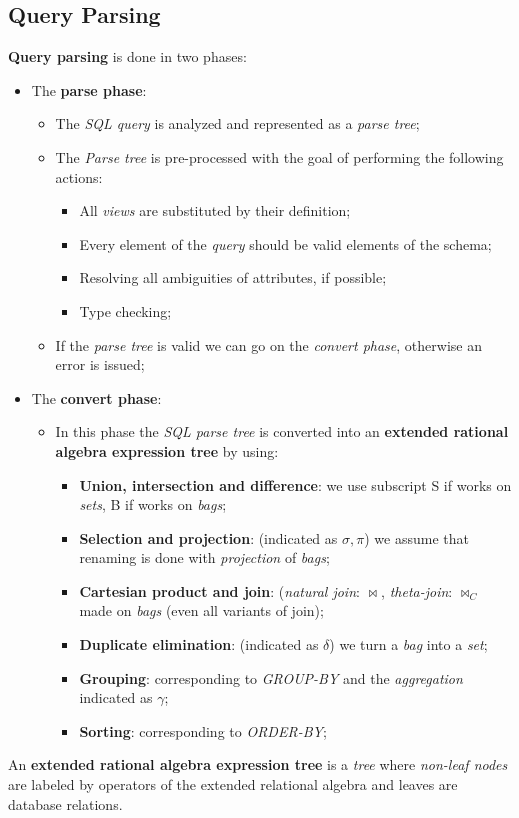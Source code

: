 \documentclass{article}
\begin{document}
\subsection{Query Parsing}
\textbf{Query parsing} is done in two phases: 
\begin{itemize}
\item The \textbf{parse phase}:
\begin{itemize}
\item The \emph{SQL query} is analyzed and represented as a \emph{parse tree};
\item The \emph{Parse tree} is pre-processed with the goal of performing the following actions:
\begin{itemize}
\item All \emph{views} are substituted by their definition;
\item Every element of the \emph{query} should be valid elements of the schema;
\item Resolving all ambiguities of attributes, if possible;
\item Type checking;
\end{itemize}
\item If the \emph{parse tree} is valid we can go on the \emph{convert phase}, otherwise an error is issued;
\end{itemize}
\item The \textbf{convert phase}:
\begin{itemize}
\item In this phase the \emph{SQL parse tree} is converted into an \textbf{extended rational algebra expression tree} by using:
\begin{itemize}
\item \textbf{Union, intersection and difference}: we use subscript S if works on \emph{sets}, B if works on \emph{bags};
\item \textbf{Selection and projection}: (indicated as $\sigma, \pi$) we assume that renaming is done with \emph{projection} of \emph{bags};
\item \textbf{Cartesian product and join}: (\emph{natural join}: $\bowtie $, \emph{theta-join}: $\bowtie_C$ made on \emph{bags} (even all variants of join);
\item \textbf{Duplicate elimination}: (indicated as $\delta$) we turn a \emph{bag} into a \emph{set};
\item \textbf{Grouping}: corresponding to \emph{GROUP-BY} and the \emph{aggregation} indicated as $\gamma$;
\item \textbf{Sorting}: corresponding to \emph{ORDER-BY};
\end{itemize} 
\end{itemize}
\end{itemize}
An \textbf{extended rational algebra expression tree} is a \emph{tree} where \emph{non-leaf nodes} are labeled by operators of the extended relational algebra and leaves are database relations.
\end{document}
